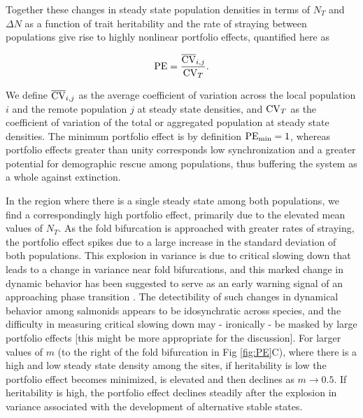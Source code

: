 \documentclass[twocolumn,preprintnumbers,amsmath,amssymb,superscriptaddress]{revtex4}
\begin{document}
Together these changes in steady state population densities in terms of $N_T$ and $\Delta N$ as a function of trait heritability and the rate of straying between populations give rise to highly nonlinear portfolio effects, quantified here as

\begin{equation}
  {\rm PE} = \frac{\overline{{\rm CV}}_{i,j}}{{\rm CV}_T}.
  \label{eq:pe}
\end{equation}

\noindent We define $\overline{{\rm CV}}_{i,j}$ as the average coefficient of variation across the local population $i$ and the remote population $j$ at steady state densities, and ${\rm CV}_T$ as the coefficient of variation of the total or aggregated population at steady state densities.
The minimum portfolio effect is by definition ${\rm PE_{\rm min}}=1$, whereas portfolio effects greater than unity corresponds low synchronization \cite{Loreau:2008ju,Anderson:2014cx,Yeakel:2013vz} and a greater potential for demographic rescue among populations, thus buffering the system as a whole against extinction. 


In the region where there is a single steady state among both populations, we find a correspondingly high portfolio effect, primarily due to the elevated mean values of $N_T$.
As the fold bifurcation is approached with greater rates of straying, the portfolio effect spikes due to a large increase in the standard deviation of both populations.
This explosion in variance is due to critical slowing down that leads to a change in variance near fold bifurcations, and this marked change in dynamic behavior has been suggested to serve as an early warning signal of an approaching phase transition \cite{Scheffer:2009gg,Anonymous:2013br,Dakos:2014br}.
The detectibility of such changes in dynamical behavior among salmonids appears to be idosynchratic across species, and the difficulty in measuring critical slowing down may - ironically - be masked by large portfolio effects \cite{Krkosek:2014ch} [this might be more appropriate for the discussion].
For larger values of $m$ (to the right of the fold bifurcation in Fig \ref{fig:PE}C), where there is a high and low steady state density among the sites, if heritability is low the portfolio effect becomes minimized, is elevated and then declines as $m\rightarrow 0.5$.
If heritability is high, the portfolio effect declines steadily after the explosion in variance associated with the development of alternative stable states.
\end{document}
